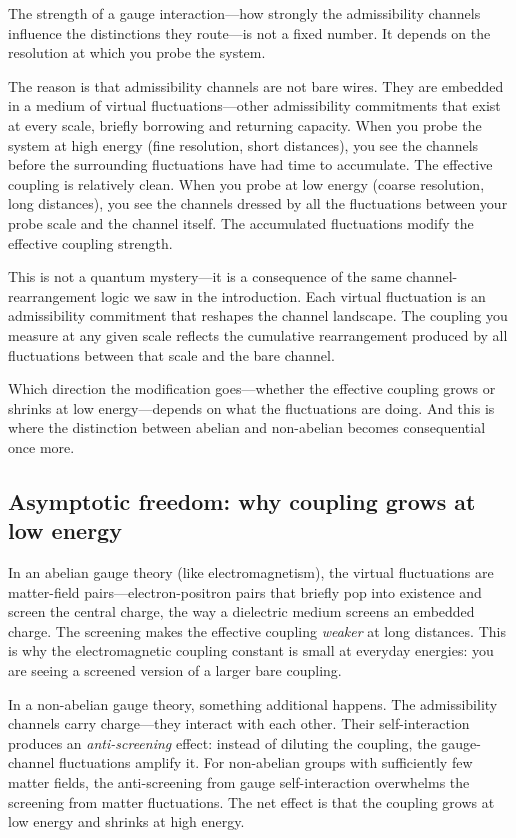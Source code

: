 \documentclass[11pt]{article}
\begin{document}
The strength of a gauge interaction---how strongly the admissibility channels influence the distinctions they route---is not a fixed number.  It depends on the resolution at which you probe the system.

The reason is that admissibility channels are not bare wires.  They are embedded in a medium of virtual fluctuations---other admissibility commitments that exist at every scale, briefly borrowing and returning capacity.  When you probe the system at high energy (fine resolution, short distances), you see the channels before the surrounding fluctuations have had time to accumulate.  The effective coupling is relatively clean.  When you probe at low energy (coarse resolution, long distances), you see the channels dressed by all the fluctuations between your probe scale and the channel itself.  The accumulated fluctuations modify the effective coupling strength.

This is not a quantum mystery---it is a consequence of the same channel-rearrangement logic we saw in the introduction.  Each virtual fluctuation is an admissibility commitment that reshapes the channel landscape.  The coupling you measure at any given scale reflects the cumulative rearrangement produced by all fluctuations between that scale and the bare channel.

Which direction the modification goes---whether the effective coupling grows or shrinks at low energy---depends on what the fluctuations are doing.  And this is where the distinction between abelian and non-abelian becomes consequential once more.

\subsection{Asymptotic freedom: why coupling grows at low energy}

In an abelian gauge theory (like electromagnetism), the virtual fluctuations are matter-field pairs---electron-positron pairs that briefly pop into existence and screen the central charge, the way a dielectric medium screens an embedded charge.  The screening makes the effective coupling \emph{weaker} at long distances.  This is why the electromagnetic coupling constant is small at everyday energies: you are seeing a screened version of a larger bare coupling.

In a non-abelian gauge theory, something additional happens.  The admissibility channels carry charge---they interact with each other.  Their self-interaction produces an \emph{anti-screening} effect: instead of diluting the coupling, the gauge-channel fluctuations amplify it.  For non-abelian groups with sufficiently few matter fields, the anti-screening from gauge self-interaction overwhelms the screening from matter fluctuations.  The net effect is that the coupling grows at low energy and shrinks at high energy.
\end{document}
